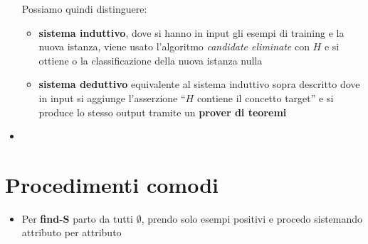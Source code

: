 \documentclass[a4paper,12pt, oneside]{article}
\begin{document}
\begin{itemize}
  Possiamo quindi distinguere:
  \begin{itemize}
    \item \textbf{sistema induttivo}, dove si hanno in input gli esempi di
    training e la nuova istanza, viene usato l'algoritmo \textit{candidate
      eliminate} con $H$ e si ottiene o la classificazione della nuova istanza
    nulla
    \item \textbf{sistema deduttivo} equivalente al sistema induttivo sopra
    descritto dove in input si aggiunge l'asserzione ``$H$ contiene il concetto
    target'' e si produce lo stesso output tramite un \textbf{prover di teoremi}
  \end{itemize}
  \item 
\end{itemize}
\newpage
\section*{Procedimenti comodi}
\begin{itemize}
  \item Per \textbf{find-S} parto da tutti $\emptyset$, prendo solo esempi
  positivi e procedo sistemando attributo per attributo
  
\end{itemize}
\end{document}
